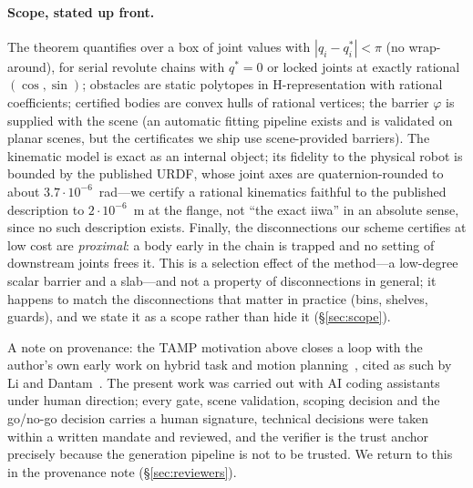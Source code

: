 \documentclass[10pt,twocolumn,letterpaper]{article}
\newcommand{\vphi}{\varphi}
\begin{document}
\paragraph{Scope, stated up front.} The theorem quantifies over a box of joint values with $|q_i-q^*_i|<\pi$ (no wrap-around), for serial revolute chains with $q^*=0$ or locked joints at exactly rational $(\cos,\sin)$; obstacles are static polytopes in H-representation with rational coefficients; certified bodies are convex hulls of rational vertices; the barrier $\vphi$ is supplied with the scene (an automatic fitting pipeline exists and is validated on planar scenes, but the certificates we ship use scene-provided barriers). The kinematic model is exact as an internal object; its fidelity to the physical robot is bounded by the published URDF, whose joint axes are quaternion-rounded to about $3.7\cdot10^{-6}$~rad---we certify a rational kinematics faithful to the published description to $2\cdot10^{-6}$~m at the flange, not ``the exact iiwa'' in an absolute sense, since no such description exists. Finally, the disconnections our scheme certifies at low cost are \emph{proximal}: a body early in the chain is trapped and no setting of downstream joints frees it. This is a selection effect of the method---a low-degree scalar barrier and a slab---and not a property of disconnections in general; it happens to match the disconnections that matter in practice (bins, shelves, guards), and we state it as a scope rather than hide it (\S\ref{sec:scope}).

A note on provenance: the TAMP motivation above closes a loop with the author's own early work on hybrid task and motion planning~\cite{cambon2009}, cited as such by Li and Dantam~\cite{li2024gpu}. The present work was carried out with AI coding assistants under human direction; every gate, scene validation, scoping decision and the go/no-go decision carries a human signature, technical decisions were taken within a written mandate and reviewed, and the verifier is the trust anchor precisely because the generation pipeline is not to be trusted. We return to this in the provenance note (\S\ref{sec:reviewers}).
\end{document}
